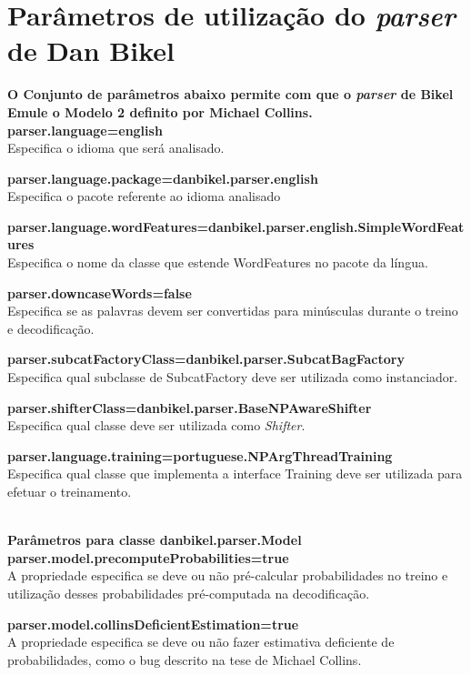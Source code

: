 \section{Parâmetros de utilização do \emph{parser} de Dan Bikel}
\label{sec:bikelest_param}

\scriptsize

\textbf{O Conjunto de parâmetros abaixo permite com que o \emph{parser} de Bikel Emule o Modelo 2 definito por Michael Collins.}\\

\textbf{parser.language=english}\\
Especifica o idioma que será analisado.

\textbf{parser.language.package=danbikel.parser.english}\\
Especifica o pacote referente ao idioma analisado

\textbf{parser.language.wordFeatures=danbikel.parser.english.SimpleWordFeatures}\\
Especifica o nome da classe que estende WordFeatures no pacote da língua.

\textbf{parser.downcaseWords=false}\\
Especifica se as palavras devem ser convertidas para minúsculas durante o treino e decodificação.

\textbf{parser.subcatFactoryClass=danbikel.parser.SubcatBagFactory}\\
Especifica qual subclasse de SubcatFactory deve ser utilizada como instanciador.

\textbf{parser.shifterClass=danbikel.parser.BaseNPAwareShifter}\\
Especifica qual classe deve ser utilizada como \emph{Shifter}.

\textbf{parser.language.training=portuguese.NPArgThreadTraining}\\
Especifica qual classe que implementa a interface Training deve ser utilizada para efetuar o treinamento.

\HRule \\

\textbf{Parâmetros para classe danbikel.parser.Model}\\

\textbf{parser.model.precomputeProbabilities=true}\\
A propriedade especifica se deve ou não pré-calcular probabilidades no treino e utilização desses probabilidades pré-computada na decodificação.

\textbf{parser.model.collinsDeficientEstimation=true}\\
A propriedade especifica se deve ou não fazer estimativa deficiente de probabilidades, como o bug descrito na tese de Michael Collins.

